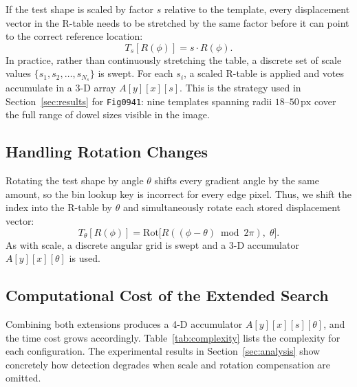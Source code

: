 \documentclass[12pt,a4paper]{article}
\begin{document}
If the test shape is scaled by factor $s$ relative to the template, every
displacement vector in the R-table needs to be stretched by the same factor before
it can point to the correct reference location:
\begin{equation}
  T_s[R(\phi)] = s \cdot R(\phi).
  \label{eq:scale_transform}
\end{equation}
In practice, rather than continuously stretching the table, a discrete set of scale
values $\{s_1, s_2, \ldots, s_{N_s}\}$ is swept.  For each $s_i$, a scaled R-table
is applied and votes accumulate in a 3-D array $A[y][x][s]$.  This is the
strategy used in Section~\ref{sec:results} for \texttt{Fig0941}: nine templates
spanning radii $18$--$50\,\text{px}$ cover the full range of dowel sizes visible in
the image.

\subsection{Handling Rotation Changes}

Rotating the test shape by angle $\theta$ shifts every gradient angle by the same
amount, so the bin lookup key is incorrect for every edge pixel.  Thus, we shift
the index into the R-table by $\theta$ and simultaneously rotate each stored
displacement vector:
\begin{equation}
  T_\theta[R(\phi)] = \text{Rot}\bigl[R((\phi - \theta) \bmod 2\pi),\; \theta\bigr].
  \label{eq:rotation_transform}
\end{equation}
As with scale, a discrete angular grid is swept and a 3-D accumulator
$A[y][x][\theta]$ is used.

\subsection{Computational Cost of the Extended Search}

Combining both extensions produces a 4-D accumulator $A[y][x][s][\theta]$, and the
time cost grows accordingly.  Table~\ref{tab:complexity} lists the complexity for
each configuration.  The experimental results in Section~\ref{sec:analysis} show
concretely how detection degrades when scale and rotation compensation are omitted.
\end{document}
